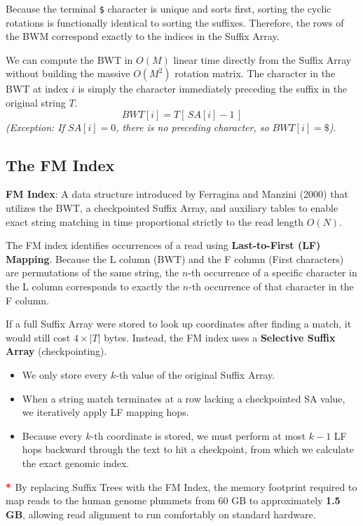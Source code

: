 \documentclass{article}
\newcommand{\sta}{\textbf{\textcolor{red}{* }}}
\begin{document}
Because the terminal \verb|$| character is unique and sorts first, sorting the cyclic rotations is functionally identical to sorting the suffixes. Therefore, the rows of the BWM correspond exactly to the indices in the Suffix Array. 

We can compute the BWT in $O(M)$ linear time directly from the Suffix Array without building the massive $O(M^2)$ rotation matrix. The character in the BWT at index $i$ is simply the character immediately preceding the suffix in the original string $T$. 
\[ BWT[i] = T[\,SA[i] - 1\,] \]
\textit{(Exception: If $SA[i] = 0$, there is no preceding character, so $BWT[i] = \$ $)}.

\subsection{The FM Index}

\begin{important}
    \textbf{FM Index}: A data structure introduced by Ferragina and Manzini (2000) that utilizes the BWT, a checkpointed Suffix Array, and auxiliary tables to enable exact string matching in time proportional strictly to the read length $O(N)$.
\end{important}

The FM index identifies occurrences of a read using \textbf{Last-to-First (LF) Mapping}. Because the L column (BWT) and the F column (First characters) are permutations of the same string, the $n$-th occurrence of a specific character in the L column corresponds to exactly the $n$-th occurrence of that character in the F column. 

If a full Suffix Array were stored to look up coordinates after finding a match, it would still cost $4 \times |T|$ bytes. Instead, the FM index uses a \textbf{Selective Suffix Array} (checkpointing).

\begin{itemize}
    \item We only store every $k$-th value of the original Suffix Array.
    \item When a string match terminates at a row lacking a checkpointed SA value, we iteratively apply LF mapping hops.
    \item Because every $k$-th coordinate is stored, we must perform at most $k-1$ LF hops backward through the text to hit a checkpoint, from which we calculate the exact genomic index.
\end{itemize}

\sta By replacing Suffix Trees with the FM Index, the memory footprint required to map reads to the human genome plummets from 60 GB to approximately \textbf{1.5 GB}, allowing read alignment to run comfortably on standard hardware.
\end{document}
